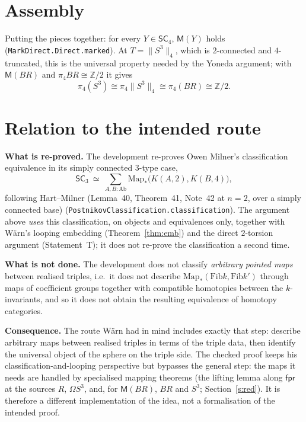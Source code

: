 \documentclass[11pt]{amsart}
\theoremstyle{definition}
\theoremstyle{remark}
\newcommand{\Om}{\Omega}
\newcommand{\Z}{\mathbb{Z}}
\newcommand{\code}[1]{\texttt{#1}}
\newcommand{\Map}{\mathrm{Map}_*}
\newcommand{\Fib}{\mathrm{Fib}}
\newcommand{\fpr}{\mathsf{fpr}}
\newcommand{\tr}[1]{\|#1\|}
\newcommand{\SCt}{\mathsf{SC}_3}
\newcommand{\SCf}{\mathsf{SC}_4}
\begin{document}
\section{Assembly}

Putting the pieces together: for every $Y\in\SCf$, $\mathsf M(Y)$ holds
(\code{MarkDirect.Direct.marked}). At $T=\tr{S^3}_4$, which is $2$-connected and
$4$-truncated, this is the universal property needed by the Yoneda argument;
with $\mathsf M(BR)$ and $\pi_4BR\cong\Z/2$ it gives
\[
  \pi_4(S^3)\cong\pi_4\tr{S^3}_4\cong\pi_4(BR)\cong\Z/2 .
\]

\section{Relation to the intended route}\label{s:route}

\noindent\textbf{What is re-proved.} The development re-proves Owen Milner's
classification equivalence in its simply connected $3$-type case,
\[
  \SCt\ \simeq\ \textstyle\sum_{A,B:\mathrm{Ab}}\Map\big(K(A,2),K(B,4)\big),
\]
following Hart--Milner (Lemma~40, Theorem~41, Note~42 at $n=2$, over a
simply connected base) (\code{PostnikovClassification.classification}). The
argument above \emph{uses} this classification, on objects and equivalences
only, together with W\"arn's looping embedding (Theorem~\ref{thm:emb}) and the
direct $2$-torsion argument (Statement~T); it does not re-prove the
classification a second time.

\smallskip\noindent\textbf{What is not done.} The development does not
classify \emph{arbitrary pointed maps} between realised triples, i.e.\ it does
not describe $\Map(\Fib k,\Fib k')$ through maps of coefficient groups
together with compatible homotopies between the $k$-invariants, and so it does
not obtain the resulting equivalence of homotopy categories.

\smallskip\noindent\textbf{Consequence.} The route W\"arn had in mind
includes exactly that step: describe arbitrary maps between realised triples
in terms of the triple data, then identify the universal object of the sphere
on the triple side. The checked proof keeps his classification-and-looping
perspective but bypasses the general step: the maps it needs are handled by
specialised mapping theorems (the lifting lemma along $\fpr$ at the sources
$R$, $\Om S^3$, and, for $\mathsf M(BR)$, $BR$ and $S^3$; Section~\ref{s:red}).
It is therefore a different implementation of the idea, not a formalisation of
the intended proof.
\end{document}

